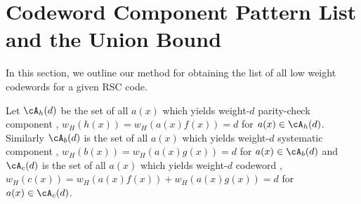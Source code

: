 \section{ Codeword Component Pattern List and the Union Bound }
\label{sec4}


In this section, we outline our method for obtaining the list of all low weight codewords for a given RSC code.

 Let $\cA_h(d)$ be the set of all $a(x)$ which yields weight-$d$ parity-check component \ie, $w_H(h(x))=w_H(a(x)f(x))=d$ for $a(x) \in \cA_h(d)$. 
Similarly $\cA_b(d)$ is the set of all $a(x)$ which yields weight-$d$ systematic component \ie, $w_H(b(x))=w_H(a(x)g(x))=d$ for $a(x) \in \cA_b(d)$
 and $\cA_c(d)$ is the set of all $a(x)$ which yields weight-$d$ codeword \ie, $w_H(c(x))=w_H(a(x)f(x))+ w_H(a(x)g(x))=d$ for $a(x) \in \cA_c(d)$.  

